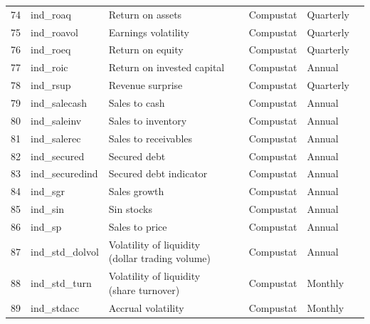 \documentclass[a4paper, table]{article}
\begin{document}
\begin{landscape}
\begin{center}
\begin{longtable}{lllllll}
			74 & ind\_roaq & Return on assets & 
				\cite{balakrishnan_post_2010} & Compustat & Quarterly \\
			75 & ind\_roavol\footnotemark[\value{footnote}] & Earnings volatility & 
				\cite{francis_costs_2004} & Compustat & Quarterly \\
			76 & ind\_roeq & Return on equity & 
				\cite{hou_digesting_2015} & Compustat & Quarterly \\
			77 & ind\_roic & Return on invested capital & 
				\cite{brown_productivity_2007} & Compustat & Annual \\
			78 & ind\_rsup & Revenue surprise & 
				\cite{kama_market_2009} & Compustat & Quarterly \\
			79 & ind\_salecash & Sales to cash & 
				\cite{ou_financial_1989} & Compustat & Annual \\
			80 & ind\_saleinv\footnotemark[\value{footnote}] & Sales to inventory & 
				\cite{ou_financial_1989} & Compustat & Annual \\
			81 & ind\_salerec & Sales to receivables & 
				\cite{ou_financial_1989} & Compustat & Annual \\
			82 & ind\_secured\footnotemark[\value{footnote}] & Secured debt & 
				\cite{valta_strategic_2016} & Compustat & Annual \\
			83 & ind\_securedind & Secured debt indicator & 
				\cite{valta_strategic_2016} & Compustat & Annual \\
			84 & ind\_sgr\footnotemark[\value{footnote}] & Sales growth & 
				\cite{barbee_jr_salesprice_1996} & Compustat & Annual \\
			85 & ind\_sin & Sin stocks & 
				\cite{hong_price_2009} & Compustat & Annual \\
			86 & ind\_sp & Sales to price & 
				\cite{barbee_jr_salesprice_1996} & Compustat & Annual \\
			87 & ind\_std\_dolvol & Volatility of liquidity (dollar trading volume) & 
				\cite{chordia_trading_2001} & Compustat & Annual \\
			88 & ind\_std\_turn & Volatility of liquidity (share turnover) & 
				\cite{chordia_trading_2001} & Compustat & Monthly \\
			89 & ind\_stdacc\footnotemark[\value{footnote}] & Accrual volatility & 
				\cite{bandyopadhyay_accrual_2010} & Compustat & Monthly \\

\end{longtable}
\end{center}
\end{landscape}
\end{document}

